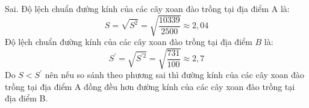 \begin{ex}
{\begin{itemchoice}
			\itemch Sai. Độ lệch chuẩn đường kính của các cây xoan đào trồng tại địa điểm A là:
			$${S}=\sqrt{{S}^{2}}=\sqrt{\dfrac{10339}{2500}} \approx 2,04$$
			Độ lệch chuẩn đường kính của các cây xoan đào trồng tại địa điểm $B$ là: $${S}^{\prime}=\sqrt{{S}^{\prime 2}}=\sqrt{\dfrac{731}{100}} \approx 2,7$$
			Do ${S}<{S}^{\prime}$ nên nếu so sánh theo phương sai thì đường kính của các cây xoan đào trồng tại địa điểm A đồng đều hơn đường kính của các cây xoan đào trồng tại địa điểm B.
		\end{itemchoice}
	}
\end{ex}

